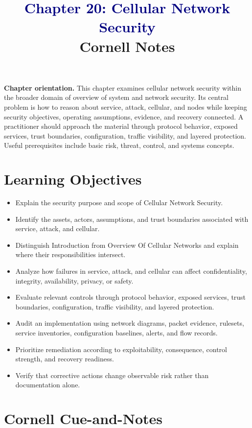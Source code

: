 \documentclass[11pt]{article}
\title{\textcolor{Navy}{Chapter 20: Cellular Network Security}\\[2mm]\large Cornell Notes}
\author{}
\date{}
\begin{document}
\maketitle
\thispagestyle{fancy}
\vspace{-1.5em}
\begin{orientationbox}
\textbf{Chapter orientation.} This chapter examines cellular network security within the broader domain of overview of system and network security. Its central problem is how to reason about service, attack, cellular, and nodes while keeping security objectives, operating assumptions, evidence, and recovery connected. A practitioner should approach the material through protocol behavior, exposed services, trust boundaries, configuration, traffic visibility, and layered protection. Useful prerequisites include basic risk, threat, control, and systems concepts.
\end{orientationbox}
\section*{Learning Objectives}
\begin{itemize}
\item Explain the security purpose and scope of Cellular Network Security.
\item Identify the assets, actors, assumptions, and trust boundaries associated with service, attack, and cellular.
\item Distinguish Introduction from Overview Of Cellular Networks and explain where their responsibilities intersect.
\item Analyze how failures in service, attack, and cellular can affect confidentiality, integrity, availability, privacy, or safety.
\item Evaluate relevant controls through protocol behavior, exposed services, trust boundaries, configuration, traffic visibility, and layered protection.
\item Audit an implementation using network diagrams, packet evidence, rulesets, service inventories, configuration baselines, alerts, and flow records.
\item Prioritize remediation according to exploitability, consequence, control strength, and recovery readiness.
\item Verify that corrective actions change observable risk rather than documentation alone.
\end{itemize}
\section*{Cornell Cue-and-Notes}
\end{document}
